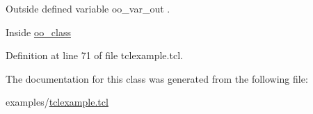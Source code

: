 Outside defined variable {\ttfamily oo\+\_\+var\+\_\+out} . 

Inside \mbox{\hyperlink{classns_1_1oo__class}{oo\+\_\+class}} 

Definition at line 71 of file tclexample.\+tcl.


\begin{DoxyCode}{0}

\end{DoxyCode}


The documentation for this class was generated from the following file\+:\begin{DoxyCompactItemize}
\item 
examples/\mbox{\hyperlink{tclexample_8tcl}{tclexample.\+tcl}}\end{DoxyCompactItemize}
